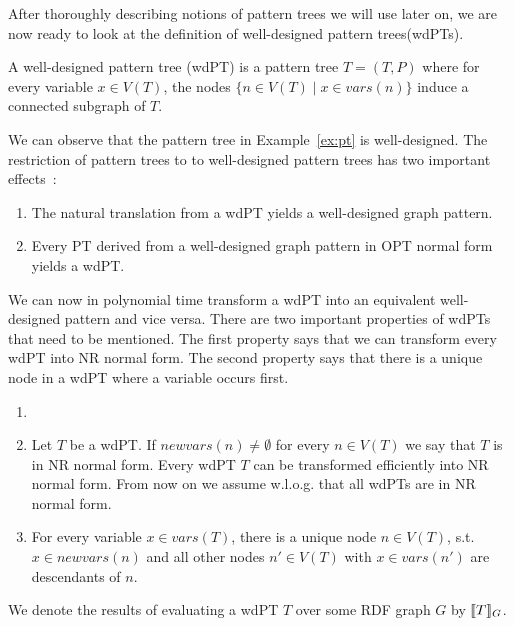 After thoroughly describing notions of pattern trees we will use later on, we are now ready
to look at the definition of well-designed pattern trees(wdPTs).

\begin{definition}
	A well-designed pattern tree (wdPT) is a pattern tree $T = (T,P)$ where for
	every variable $x \in V(T)$, the nodes $\{n \in V(T) \mid x \in vars(n)\}$
	induce a connected subgraph of $T$.
\end{definition}
We can observe that the pattern tree in Example~\ref{ex:pt} is well-designed.
The restriction of pattern trees to to well-designed pattern trees has two
important effects~\cite{pichler2014containment}: 
\begin{enumerate}
	\item The natural translation from a wdPT yields a well-designed graph pattern.
	\item Every PT derived from a well-designed graph pattern in OPT normal form
		yields a wdPT. 
\end{enumerate}
We can now in polynomial time transform a wdPT into an equivalent well-designed
pattern and vice versa.
There are two important properties of wdPTs that need to be mentioned. 
The first property says that we can transform every wdPT into NR
normal form. The second property says that there is a unique node in a wdPT where a
variable occurs first.

\begin{proposition}
	\begin{enumerate}	
		\item[]
		\item Let $T$ be a wdPT. If $newvars(n) \neq	\emptyset$ for every $n
			\in V(T)$ we say that $T$ is in NR normal form.  
			Every wdPT $\mathit{T}$ can be transformed efficiently into NR
			normal form. From now on we assume w.l.o.g. that all wdPTs are in NR normal form.

		\item For every variable $x \in vars (T)$, there is a unique node $n \in
			V(T)$, s.t. $x \in newvars(n)$ and all other nodes $n' \in V(T)$
			with $x \in vars(n')$ are descendants of $n$.
	\end{enumerate}
\end{proposition}

We denote the results of evaluating a wdPT $T$ over some RDF graph $G$ by $\llbracket T
\rrbracket_G$. %


